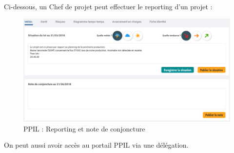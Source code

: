 Ci-dessous, un Chef de projet peut effectuer le reporting d'un projet :

\begin{figure}[!h]
\centering
\includegraphics[width=1\textwidth]{images/ppil-meteo.PNG}
\caption{PPIL : Reporting et note de conjoncture}
\end{figure}

On peut aussi avoir accès au portail PPIL via une délégation.

